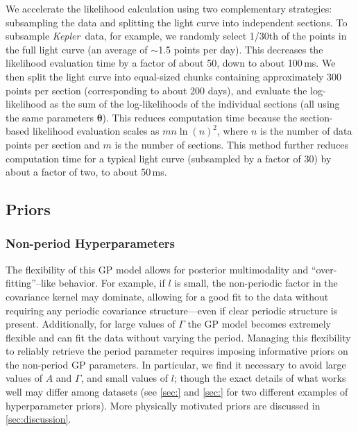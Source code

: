 \documentclass[useAMS, usenatbib, preprint, 12pt]{aastex}
\newcommand{\Kepler}{{\it Kepler}}
\begin{document}
We accelerate the likelihood calculation using two complementary strategies:
subsampling the data and splitting the light curve into independent sections.
To subsample \Kepler\ data, for example,
we randomly select 1/30th of the points
in the full light curve (an average of $\sim$1.5 points per day).
This decreases the likelihood evaluation time by a factor of about 50, down to
about 100\,ms.
We then split the light curve into equal-sized chunks containing approximately
300 points per section (corresponding to about 200 days), and evaluate the
log-likelihood as the sum of the log-likelihoods of the individual sections
(all using the same parameters ${\bm \theta}$).
This reduces computation time because the section-based likelihood evaluation
scales as $mn\ln(n)^2$, where $n$ is the number of data points per section and
$m$ is the number of sections.
This method further reduces computation time for a typical light curve
(subsampled by a factor of 30) by about a factor of two, to about 50\,ms.

\subsection{Priors}
\label{sec:GP_prior}

\subsubsection{Non-period Hyperparameters}
\label{sec:nonperiod_prior}

The flexibility of this GP model allows for posterior multimodality and
``over-fitting''--like behavior.
For example, if $l$ is small, the non-periodic factor in the covariance
kernel may dominate, allowing for a good fit to the data without
requiring any periodic covariance structure---even if clear periodic
structure is present.
Additionally, for large values of $\Gamma$ the GP model becomes extremely
flexible and can fit the data without varying the period.
Managing this flexibility to reliably retrieve the period parameter requires
imposing informative priors on the non-period GP parameters.
In particular, we find it necessary to avoid large values of
$A$ and $\Gamma$, and small values of $l$; though the exact details of what
works well may differ among datasets (see \ref{sec:} and
\ref{sec:} for two different examples of hyperparameter priors).
More physically motivated priors are discussed in \textsection
\ref{sec:discussion}.
\end{document}
